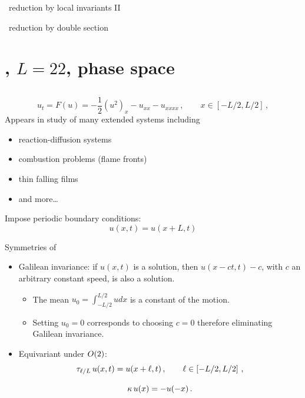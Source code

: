 \documentclass{beamer}
\begin{document}
\begin{frame}{\CLe\ reduction by local invariants II}
\end{frame}

\begin{frame}{\CLe\ reduction by double section}
\end{frame}


\section[\KSe]{\KS, $L=22$, phase space }

\subsection{\KSe}

\begin{frame}{\KSe}
\[
  u_t = F(u) = -{\textstyle\frac{1}{2}}(u^2)_x-u_{xx}-u_{xxxx}
    \,,\qquad   x \in [-L/2,L/2]
    \,,
\]
Appears in study of many extended systems including
\begin{itemize}
 \item reaction-diffusion systems
 \item combustion problems (flame fronts)
 \item thin falling films
 \item and more\ldots
\end{itemize}


Impose periodic boundary conditions:
\[
 u(x,t) = u(x+L,t)
\]
\end{frame}

\begin{frame}{Symmetries of \KSe}

\begin{itemize}
 \item Galilean invariance: if $u(x,t)$ is a solution, then $u(x-ct,t)-c$, with $c$ an arbitrary constant
	speed, is also a solution.
	\begin{itemize}
		\item The mean $u_0=\int_{-L/2}^{L/2} u dx$ is a constant of the motion. \\
		\item Setting $u_0=0$ corresponds to choosing $c=0$ therefore eliminating Galilean invariance.
	\end{itemize}
 \item Equivariant under $O(2)$:
\[
	\tau_{\ell/L}\, u(x,t) = u(x+\ell,t)\,,\qquad \ell\in\left[-L/2,L/2\right]\,,
\]

\[
    \kappa \, u(x) = -u(-x)
\,.
\]
\end{itemize}
\end{frame}
\end{document}
